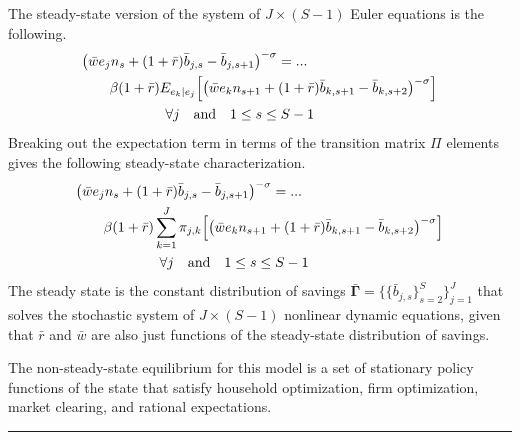\documentclass[letterpaper,12pt]{article}
\theoremstyle{definition}
\numberwithin{equation}{section}
\numberwithin{exercise}{section}
\begin{document}
      \begin{spacing}{1.5}

      The steady-state version of the system of $J\times(S-1)$ Euler equations is the following.
      \begin{equation}\label{EqSperStochEulSSa}
         \begin{split}
            &\bigl(\bar{w}e_{j}n_{s} + (1+\bar{r})\bar{b}_{j,s} - \bar{b}_{j,s+1}\bigr)^{-\sigma} = ... \\
            &\qquad \beta(1+\bar{r})E_{e_k|e_j}\Bigl[\bigl(\bar{w}e_{k}n_{s+1} + (1+\bar{r})\bar{b}_{k,s+1} - \bar{b}_{k,s+2}\bigr)^{-\sigma}\Bigr] \\
            &\qquad\qquad\qquad\forall j \quad\text{and}\quad 1\leq s\leq S-1
         \end{split}
      \end{equation}
      Breaking out the expectation term in terms of the transition matrix $\Pi$ elements gives the following steady-state characterization.
      \begin{equation}\label{EqSperStochEulSSb}
         \begin{split}
            &\bigl(\bar{w}e_{j}n_{s} + (1+\bar{r})\bar{b}_{j,s} - \bar{b}_{j,s+1}\bigr)^{-\sigma} = ... \\
            &\qquad \beta(1+\bar{r})\sum_{k=1}^J\pi_{j,k}\Bigl[\bigl(\bar{w}e_{k}n_{s+1} + (1+\bar{r})\bar{b}_{k,s+1} - \bar{b}_{k,s+2}\bigr)^{-\sigma}\Bigr] \\
            &\qquad\qquad\qquad\forall j \quad\text{and}\quad 1\leq s\leq S-1
         \end{split}
      \end{equation}
      The steady state is the constant distribution of savings $\bm{\bar{\Gamma}}=\bigl\{\{\bar{b}_{j,s}\}_{s=2}^S\bigr\}_{j=1}^J$ that solves the stochastic system of $J\times(S-1)$ nonlinear dynamic equations, given that $\bar{r}$ and $\bar{w}$ are also just functions of the steady-state distribution of savings.

      The non-steady-state equilibrium for this model is a set of stationary policy functions of the state that satisfy household optimization, firm optimization, market clearing, and rational expectations.

      \end{spacing}
      \vspace{5mm}
      \hrule
      \vspace{-1mm}
\end{document}
